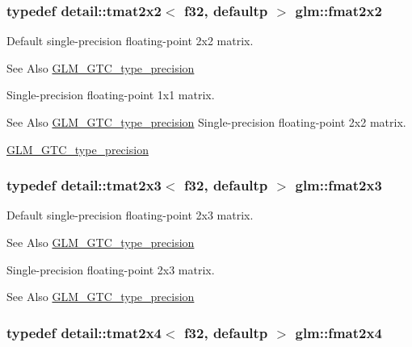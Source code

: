 \hypertarget{group__gtc__type__precision_gada7823c23ae249dccaecb5a016c667f4}{
\subsubsection[{fmat2x2}]{\setlength{\rightskip}{0pt plus 5cm}typedef detail\-::tmat2x2$<$ f32, defaultp $>$ {\bf glm\-::fmat2x2}}}\label{group__gtc__type__precision_gada7823c23ae249dccaecb5a016c667f4}
Default single-\/precision floating-\/point 2x2 matrix. \begin{DoxySeeAlso}{See Also}
\hyperlink{group__gtc__type__precision}{G\-L\-M\-\_\-\-G\-T\-C\-\_\-type\-\_\-precision}
\end{DoxySeeAlso}
Single-\/precision floating-\/point 1x1 matrix. \begin{DoxySeeAlso}{See Also}
\hyperlink{group__gtc__type__precision}{G\-L\-M\-\_\-\-G\-T\-C\-\_\-type\-\_\-precision} Single-\/precision floating-\/point 2x2 matrix. 

\hyperlink{group__gtc__type__precision}{G\-L\-M\-\_\-\-G\-T\-C\-\_\-type\-\_\-precision} 
\end{DoxySeeAlso}
\hypertarget{group__gtc__type__precision_ga087d875cd4e384f101a28a4caf8ccd94}{
\subsubsection[{fmat2x3}]{\setlength{\rightskip}{0pt plus 5cm}typedef detail\-::tmat2x3$<$ f32, defaultp $>$ {\bf glm\-::fmat2x3}}}\label{group__gtc__type__precision_ga087d875cd4e384f101a28a4caf8ccd94}
Default single-\/precision floating-\/point 2x3 matrix. \begin{DoxySeeAlso}{See Also}
\hyperlink{group__gtc__type__precision}{G\-L\-M\-\_\-\-G\-T\-C\-\_\-type\-\_\-precision}
\end{DoxySeeAlso}
Single-\/precision floating-\/point 2x3 matrix. \begin{DoxySeeAlso}{See Also}
\hyperlink{group__gtc__type__precision}{G\-L\-M\-\_\-\-G\-T\-C\-\_\-type\-\_\-precision} 
\end{DoxySeeAlso}
\hypertarget{group__gtc__type__precision_gaf3af7a2f10aaf8028a95b7232b24d84e}{
\subsubsection[{fmat2x4}]{\setlength{\rightskip}{0pt plus 5cm}typedef detail\-::tmat2x4$<$ f32, defaultp $>$ {\bf glm\-::fmat2x4}}}\label{group__gtc__type__precision_gaf3af7a2f10aaf8028a95b7232b24d84e}
